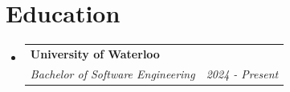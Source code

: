 \documentclass[letterpaper,11pt]{article}
\makeatletter
\newcommand{\resumeSubheading}[4]{
  \vspace{-2pt}\item
    \begin{tabular*}{0.97\textwidth}[t]{l@{\extracolsep{\fill}}r}
      \textbf{#1} & #2 \\
      \textit{\small#3} & \textit{\small #4} \\
    \end{tabular*}\vspace{-7pt}
}
\newcommand{\resumeSubHeadingListStart}{\begin{itemize}[leftmargin=0.15in, label={}]}
\newcommand{\resumeSubHeadingListEnd}{\end{itemize}}
\makeatother
\begin{document}
\section{Education}
    \resumeSubHeadingListStart
        \resumeSubheading
            {University of Waterloo}{}
            {Bachelor of Software Engineering}{\textit{2024 - Present}}
        \resumeSubHeadingListEnd
\end{document}
